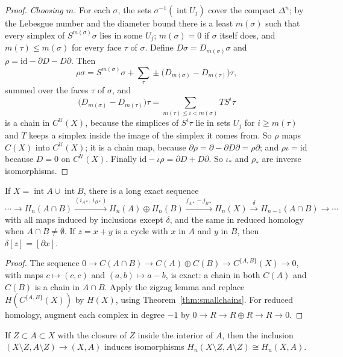 \begin{proof}
\emph{Choosing $m$.} For each $\sigma$, the sets $\sigma^{-1}(\operatorname{int}U_j)$ cover the compact $\Delta^n$; by the Lebesgue number and the diameter bound there is a least $m(\sigma)$ such that every simplex of
$S^{m(\sigma)}\sigma$ lies in some $U_j$; $m(\sigma)=0$ if $\sigma$ itself does, and $m(\tau)\le m(\sigma)$ for every face $\tau$ of $\sigma$. Define $D\sigma=D_{m(\sigma)}\sigma$ and $\rho=\mathrm{id}-\partial D-D\partial$. Then
\[\rho\sigma=S^{m(\sigma)}\sigma+\sum_\tau\pm\bigl(D_{m(\sigma)}-D_{m(\tau)}\bigr)\tau,\]
summed over the faces $\tau$ of $\sigma$, and
\[\bigl(D_{m(\sigma)}-D_{m(\tau)}\bigr)\tau=\sum_{m(\tau)\le i<m(\sigma)}TS^i\tau\]
is a chain in $C^{\mathcal U}(X)$, because the simplices of $S^i\tau$ lie in sets $U_j$ for $i\ge m(\tau)$ and $T$
keeps a simplex inside the image of the simplex it comes from. So $\rho$ maps $C(X)$ into $C^{\mathcal U}(X)$; it is a chain map, because $\partial\rho=\partial-\partial D\partial=\rho\partial$; and $\rho\iota=\mathrm{id}$ because $D=0$ on
$C^{\mathcal U}(X)$. Finally $\mathrm{id}-\iota\rho=\partial D+D\partial$. So $\iota_*$ and $\rho_*$ are inverse isomorphisms.
\end{proof}

\begin{theorem}\label{thm:mv}
If $X=\operatorname{int}A\cup\operatorname{int}B$, there is a long exact sequence
\[\cdots\to H_n(A\cap B)\xrightarrow{(i_{A*},\,i_{B*})}H_n(A)\oplus H_n(B)\xrightarrow{j_{A*}-j_{B*}}H_n(X)\xrightarrow{\delta}H_{n-1}(A\cap B)\to\cdots\]
with all maps induced by inclusions except $\delta$, and the same in reduced homology when $A\cap B\ne\emptyset$. If $z=x+y$ is a cycle with $x$ in $A$ and $y$ in $B$, then $\delta[z]=[\partial x]$.
\end{theorem}

\begin{proof}
The sequence $0\to C(A\cap B)\to C(A)\oplus C(B)\to C^{\{A,B\}}(X)\to0$, with maps $c\mapsto(c,c)$ and $(a,b)\mapsto a-b$, is exact: a chain in both $C(A)$ and $C(B)$ is a chain in $A\cap B$. Apply the
zigzag lemma and replace $H(C^{\{A,B\}}(X))$ by $H(X)$, using Theorem~\ref{thm:smallchains}. For reduced homology, augment each complex in degree $-1$ by $0\to R\to R\oplus R\to R\to0$.
\end{proof}

\begin{corollary}[excision]\label{cor:excision}
If $Z\subset A\subset X$ with the closure of $Z$ inside the interior of $A$, then the inclusion $(X\setminus Z,A\setminus Z)\to(X,A)$ induces isomorphisms $H_n(X\setminus Z,A\setminus Z)\cong H_n(X,A)$.
\end{corollary}

